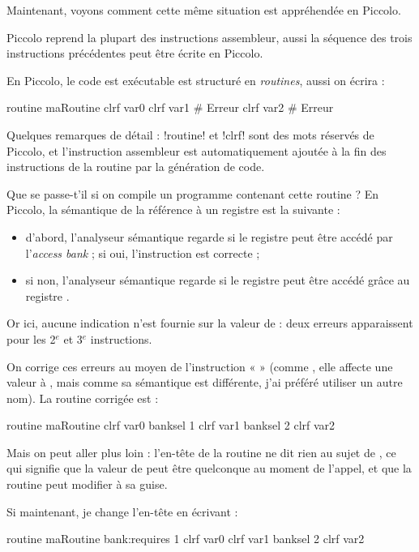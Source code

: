 Maintenant, voyons comment cette même situation est appréhendée en Piccolo.

Piccolo reprend la plupart des instructions assembleur, aussi la séquence des trois instructions précédentes peut être écrite en Piccolo.

En Piccolo, le code est exécutable est structuré en \emph{routines}, aussi on écrira :
\begin{piccolo}
routine maRoutine {
  clrf  var0
  clrf  var1  # Erreur
  clrf  var2  # Erreur
}
\end{piccolo}

Quelques remarques de détail : \pic!routine! et \pic!clrf! sont des mots réservés de Piccolo, et l’instruction assembleur  est automatiquement ajoutée à la fin des instructions de la routine par la génération de code.

Que se passe-t'il si on compile un programme contenant cette routine ? En Piccolo, la sémantique de la référence à un registre est la suivante :\begin{itemize}
\item d'abord, l'analyseur sémantique regarde si le registre peut être accédé par l'\emph{access bank} ; si oui, l'instruction est correcte ;
\item si non, l'analyseur sémantique regarde si le registre peut être accédé grâce au registre .
\end{itemize}

Or ici, aucune indication n'est fournie sur la valeur de  : deux erreurs apparaissent pour les 2$^e$ et 3$^e$ instructions.

On corrige ces erreurs au moyen de l’instruction «  » (comme , elle affecte une valeur à , mais comme sa sémantique est différente, j’ai préféré utiliser un autre nom). La routine corrigée est :
\begin{piccolo}
routine maRoutine {
  clrf  var0
  banksel 1
  clrf  var1
  banksel 2
  clrf  var2
}
\end{piccolo}


Mais on peut aller plus loin : l’en-tête de la routine ne dit rien au sujet de , ce qui signifie que la valeur de  peut être quelconque au moment de l’appel, et que la routine peut modifier  à sa guise.

Si maintenant, je change l’en-tête en écrivant :
\begin{piccolo}
routine maRoutine bank:requires 1 {
  clrf  var0
  clrf  var1
  banksel 2
  clrf  var2
}
\end{piccolo}

